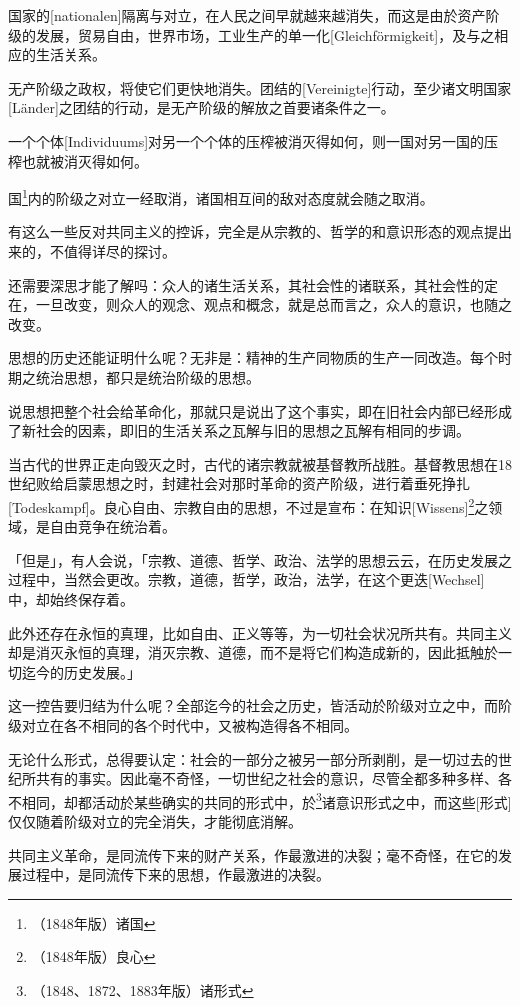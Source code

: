 \documentclass[a4paper,12pt]{ctexart}
\begin{document}
国家的[nationalen]隔离与对立，在人民之间早就越来越消失，而这是由於资产阶级的发展，贸易自由，世界市场，工业生产的单一化[Gleichförmigkeit]，及与之相应的生活关系。

无产阶级之政权，将使它们更快地消失。团结的[Vereinigte]行动，至少诸文明国家[Länder]之团结的行动，是无产阶级的解放之首要诸条件之一。

一个个体[Individuums]对另一个个体的压榨被消灭得如何，则一国对另一国的压榨也就被消灭得如何。

国\footnote{（1848年版）诸国}内的阶级之对立一经取消，诸国相互间的敌对态度就会随之取消。

有这么一些反对共同主义的控诉，完全是从宗教的、哲学的和意识形态的观点提出来的，不值得详尽的探讨。

还需要深思才能了解吗：众人的诸生活关系，其社会性的诸联系，其社会性的定在，一旦改变，则众人的观念、观点和概念，就是总而言之，众人的意识，也随之改变。

思想的历史还能证明什么呢？无非是：精神的生产同物质的生产一同改造。每个时期之统治思想，都只是统治阶级的思想。

说思想把整个社会给革命化，那就只是说出了这个事实，即在旧社会内部已经形成了新社会的因素，即旧的生活关系之瓦解与旧的思想之瓦解有相同的步调。


当古代的世界正走向毁灭之时，古代的诸宗教就被基督教所战胜。基督教思想在18世纪败给启蒙思想之时，封建社会对那时革命的资产阶级，进行着垂死挣扎[Todeskampf]。良心自由、宗教自由的思想，不过是宣布：在知识[Wissens]\footnote{（1848年版）良心}之领域，是自由竞争在统治着。

「但是」，有人会说，「宗教、道德、哲学、政治、法学的思想云云，在历史发展之过程中，当然会更改。宗教，道德，哲学，政治，法学，在这个更迭[Wechsel]中，却始终保存着。

此外还存在永恒的真理，比如自由、正义等等，为一切社会状况所共有。共同主义却是消灭永恒的真理，消灭宗教、道德，而不是将它们构造成新的，因此抵触於一切迄今的历史发展。」

这一控告要归结为什么呢？全部迄今的社会之历史，皆活动於阶级对立之中，而阶级对立在各不相同的各个时代中，又被构造得各不相同。

无论什么形式，总得要认定：社会的一部分之被另一部分所剥削，是一切过去的世纪所共有的事实。因此毫不奇怪，一切世纪之社会的意识，尽管全都多种多样、各不相同，却都活动於某些确实的共同的形式中，於\footnote{（1848、1872、1883年版）诸形式}诸意识形式之中，而这些[形式]仅仅随着阶级对立的完全消失，才能彻底消解。

共同主义革命，是同流传下来的财产关系，作最激进的决裂；毫不奇怪，在它的发展过程中，是同流传下来的思想，作最激进的决裂。
\end{document}
